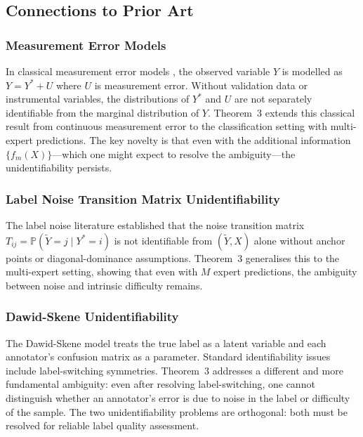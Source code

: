 \subsection{Connections to Prior Art}
\label{sec:thm3_prior}

\subsubsection{Measurement Error Models}

In classical measurement error models
\cite{fuller1987measurement,carroll2006measurement}, the observed variable
$Y$ is modelled as $Y=Y^*+U$ where $U$ is measurement error.  Without
validation data or instrumental variables, the distributions of $Y^*$ and
$U$ are not separately identifiable from the marginal distribution of $Y$.
Theorem~3 extends this classical result from continuous measurement error to
the classification setting with multi-expert predictions.  The key novelty is
that even with the additional information $\{f_m(X)\}$---which one might
expect to resolve the ambiguity---the unidentifiability persists.

\subsubsection{Label Noise Transition Matrix Unidentifiability}

The label noise literature \cite{menon2015learning,patrini2017making}
established that the noise transition matrix $T_{ij}=\mathbb{P}(\tilde Y=j\mid
Y^*=i)$ is not identifiable from $(\tilde Y,X)$ alone without anchor points or
diagonal-dominance assumptions.  Theorem~3 generalises this to the multi-expert
setting, showing that even with $M$ expert predictions, the ambiguity between
noise and intrinsic difficulty remains.

\subsubsection{Dawid-Skene Unidentifiability}

The Dawid-Skene model \cite{dawid1979maximum} treats the true label as a latent
variable and each annotator's confusion matrix as a parameter.  Standard
identifiability issues include label-switching symmetries.  Theorem~3 addresses
a different and more fundamental ambiguity: even after resolving
label-switching, one cannot distinguish whether an annotator's error is due to
noise in the label or difficulty of the sample.  The two unidentifiability
problems are orthogonal: both must be resolved for reliable label quality
assessment.

